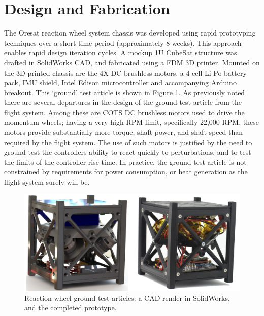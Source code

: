 \documentclass[]{aiaa-tc}%
\begin{document}
\section{Design and Fabrication}
	The Oresat reaction wheel system chassis was developed using rapid prototyping techniques over a short time period (approximately 8 weeks). This approach enables rapid design iteration cycles. A mockup 1U CubeSat structure was drafted in SolidWorks CAD, and fabricated using a FDM 3D printer. Mounted on the 3D-printed chassis are the 4X DC brushless motors, a 4-cell Li-Po battery pack, IMU shield, Intel Edison microcontroller and accompanying Arduino breakout. This `ground' test article is shown in Figure \ref{fig:rcs}. As previously noted there are several departures in the design of the ground test article from the flight system. Among these are COTS DC brushless motors used to drive the momentum wheels; having a very high RPM limit, specifically 22,000 RPM, these motors provide substantially more torque, shaft power, and shaft speed than required by the flight system. The use of such motors is justified by the need to ground test the controllers ability to react quickly to perturbations, and to test the limits of the controller rise time. In practice, the ground test article is not constrained by requirements for power consumption, or heat generation as the flight system surely will be. 

\begin{figure}[h!]
  \centering
  \includegraphics[width=0.7\linewidth]{20160224_195322.png}
  \caption{Reaction wheel ground test articles: a CAD render in SolidWorks, and the completed prototype.}
  \label{fig:rcs}
\end{figure}
\end{document}
